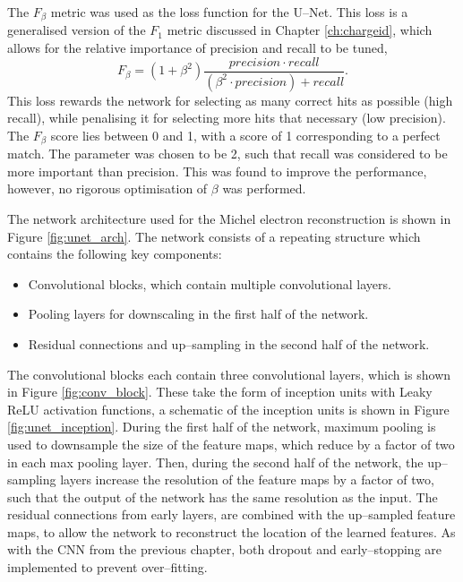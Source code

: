 The $F_\beta$ metric was used as the loss function for the U--Net. This loss is
a generalised version of the $F_1$ metric discussed in Chapter
\ref{ch:chargeid}, which allows for the relative importance of precision and
recall to be tuned,
\begin{equation}
	F_\beta = \left( 1 + \beta^2\right) \frac{precision \cdot
	recall}{\left(\beta^2 \cdot precision\right) + recall}.
\end{equation}
This loss rewards the network for selecting as many correct hits as possible
(high recall), while penalising it for selecting more hits that necessary (low
precision). The $F_\beta$ score lies between 0 and 1, with a score of 1
corresponding to a perfect match. The \beta parameter was chosen to be 2, such 
that recall was considered to be more important than precision. This was found
to improve the performance, however, no rigorous optimisation of $\beta$ was
performed.

The network architecture used for the Michel electron reconstruction is shown in
Figure \ref{fig:unet_arch}. The network consists of a repeating structure which
contains the following key components:
\begin{itemize}
	\item Convolutional blocks, which contain multiple convolutional layers.
	\item Pooling layers for downscaling in the first half of the network.
	\item Residual connections and up--sampling in the second half of the network.
\end{itemize}
The convolutional blocks each contain three convolutional layers, which is 
shown in Figure \ref{fig:conv_block}. These take the form of inception 
units\cite{Szegedy2015} with Leaky ReLU activation functions, a schematic of 
the inception units is shown in Figure \ref{fig:unet_inception}. During the 
first half of the network, maximum pooling is used to downsample the size of 
the feature maps, which reduce by a factor of two in each max pooling layer. 
Then, during the second half of the network, the up--sampling layers increase 
the resolution of the feature maps by a factor of two, such that the output of 
the network has the same resolution as the input.  The residual connections 
from early layers, are combined with the up--sampled feature maps, to allow 
the network to reconstruct the location of the learned features. As with the 
CNN from the previous chapter, both dropout and early--stopping are 
implemented to prevent over--fitting.

